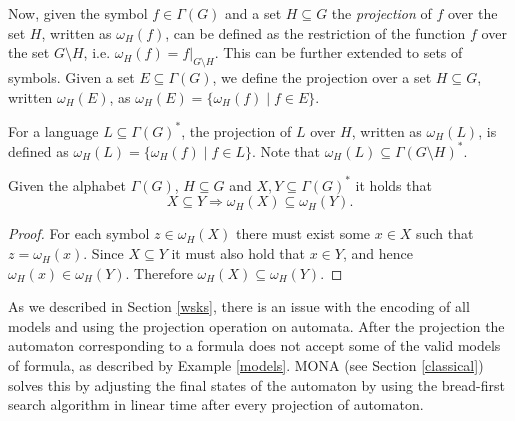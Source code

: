 Now, given the symbol $f \in \Gamma(G)$ and a set $H \subseteq G$ the
\emph{projection} of $f$ over the set $H$, written as $\omega_H(f)$, can be
defined as the restriction of the function $f$ over the set $G\setminus H$, i.e.
$\omega_H(f) = f|_{G\setminus H}$. This can be further extended to sets of symbols. Given a
set $E \subseteq \Gamma(G)$, we define the projection over a set $H \subseteq
G$, written $\omega_H(E)$, as $\omega_H(E) = \{\omega_H(f) \mid f \in E\}$.

For a language $L \subseteq \Gamma(G)^*$, the projection of $L$ over $H$,
written as $\omega_H(L)$, is defined as $\omega_H(L) = \{\omega_H(f) \mid f \in
L\}$. Note that $\omega_H(L) \subseteq \Gamma(G\setminus H)^*$.

\begin{lemma} Given the alphabet $\Gamma(G)$, $H \subseteq G$ and $X, Y
\subseteq \Gamma(G)^*$ it holds that
\begin{equation}
 X \subseteq Y \Longrightarrow \omega_H(X) \subseteq \omega_H(Y).
\end{equation}
\end{lemma}
\begin{proof}
For each symbol $z \in \omega_H(X)$ there must exist some $x \in X$ such that
$z = \omega_H(x)$. Since $X \subseteq Y$ it must also hold that $x \in Y$, and
hence $\omega_H(x) \in \omega_H(Y)$. Therefore $\omega_H(X) \subseteq
\omega_H(Y)$.
\end{proof}

As we described in Section \ref{wsks}, there is an issue with the encoding of
all models and using the projection operation on automata. After the projection the
automaton corresponding to a formula does not accept some of the valid models
of formula, as described by Example \ref{models}. \textsc{MONA} (see Section
\ref{classical}) solves this by adjusting the final states of the automaton by
using the bread-first search algorithm in linear time after every projection of
automaton.

